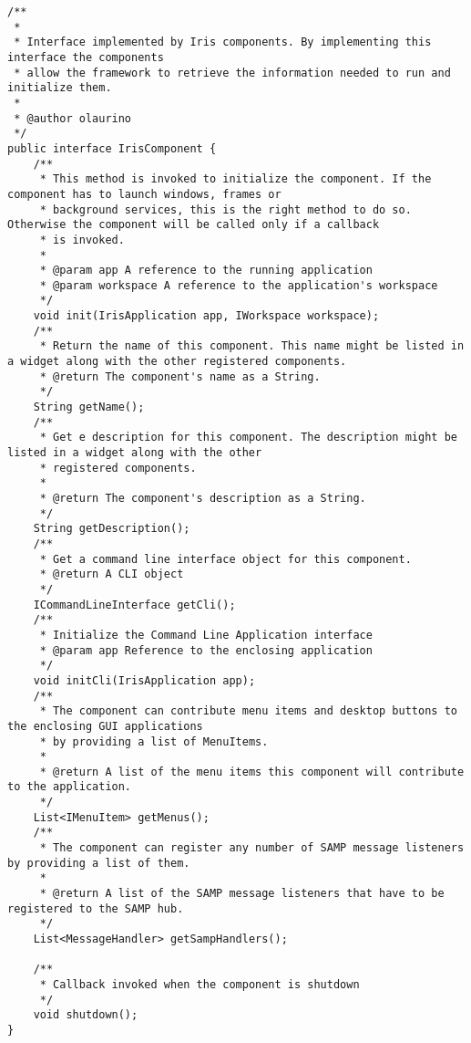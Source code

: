 \begin{verbatim}
/**
 *
 * Interface implemented by Iris components. By implementing this interface the components
 * allow the framework to retrieve the information needed to run and initialize them.
 *
 * @author olaurino
 */
public interface IrisComponent {
    /**
     * This method is invoked to initialize the component. If the component has to launch windows, frames or
     * background services, this is the right method to do so. Otherwise the component will be called only if a callback
     * is invoked.
     *
     * @param app A reference to the running application
     * @param workspace A reference to the application's workspace
     */
    void init(IrisApplication app, IWorkspace workspace);
    /**
     * Return the name of this component. This name might be listed in a widget along with the other registered components.
     * @return The component's name as a String.
     */
    String getName();
    /**
     * Get e description for this component. The description might be listed in a widget along with the other
     * registered components.
     *
     * @return The component's description as a String.
     */
    String getDescription();
    /**
     * Get a command line interface object for this component.
     * @return A CLI object
     */
    ICommandLineInterface getCli();
    /**
     * Initialize the Command Line Application interface
     * @param app Reference to the enclosing application
     */
    void initCli(IrisApplication app);
    /**
     * The component can contribute menu items and desktop buttons to the enclosing GUI applications
     * by providing a list of MenuItems.
     *
     * @return A list of the menu items this component will contribute to the application.
     */
    List<IMenuItem> getMenus();
    /**
     * The component can register any number of SAMP message listeners by providing a list of them.
     *
     * @return A list of the SAMP message listeners that have to be registered to the SAMP hub.
     */
    List<MessageHandler> getSampHandlers();

    /**
     * Callback invoked when the component is shutdown
     */
    void shutdown();
}
\end{verbatim}